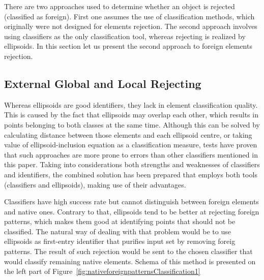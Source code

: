 \documentclass{llncs}
\begin{document}
There are two approaches used to determine whether an object is rejected (classified as foreign). First one assumes the use of classification methods, which originally were not designed for elements rejection. The second approach involves using classifiers as the only classification tool, whereas rejecting is realized by ellipsoids. In this section let us present the second approach to foreign elements rejection.

\subsection{External Global and Local Rejecting}
  \label{subsec:GlobalLocalRejecting}

Whereas ellipsoids are good identifiers, they lack in element classification quality. This is caused by the fact that ellipsoids may overlap each other, which results in points belonging to both classes at the same time. Although this can be solved by calculating distance between those elements and each ellipsoid centre, or taking value of ellipsoid-inclusion equation as a classification measure, tests have proven that such approaches are more prone to errors than other classifiers mentioned in this paper. Taking into considerations both strengths and weaknesses of classifiers and identifiers, the combined solution has been prepared that employs both tools (classifiers and ellipsoids), making use of their advantages.

Classifiers have high success rate but cannot distinguish between foreign elements and native ones. Contrary to that, ellipsoids tend to be better at rejecting foreign patterns, which makes them good at identifying points that should not be classified. The natural way of dealing with that problem would be to use ellipsoids as first-entry identifier that purifies input set by removing foreig patterns. The result of such rejection would be sent to the chosen classifier that would classify remaining native elements. Schema of this method is presented on the left part of Figure~\ref{fig:nativeforeignpatternsClassification1}
\end{document}
